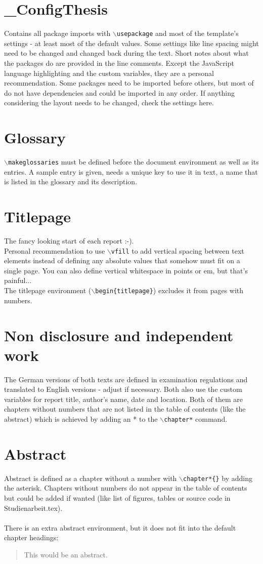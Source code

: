 \section{\_ConfigThesis}
%
Contains all package imports with \texttt{$\backslash$usepackage} and most of the template's settings - at least most of the default values. Some settings like line spacing might need to be changed and changed back during the text. Short notes about what the packages do are provided in the line comments. Except the JavaScript language highlighting and the custom variables, they are a personal recommendation. Some packages need to be imported before others, but most of do not have dependencies and could be imported in any order. If anything considering the layout needs to be changed, check the settings here.
%
\section{Glossary}
%
\texttt{$\backslash$makeglossaries} must be defined before the document environment as well as its entries. A sample entry is given, needs a unique key to use it in text, a name that is listed in the glossary and its description.
%
\section{Titlepage}
%
The fancy looking start of each report :-).\\
Personal recommendation to use \texttt{$\backslash$vfill} to add vertical spacing between text elements instead of defining any absolute values that somehow must fit on a single page. You can also define vertical whitespace in points or em, but that's painful...\\
The titlepage environment (\texttt{$\backslash$begin\{titlepage\}}) excludes it from pages with numbers.
%
\section{Non disclosure and independent work}
%
The German versions of both texts are defined in examination regulations and translated to English versions - adjust if necessary. Both also use the custom variables for report title, author's name, date and location. Both of them are chapters without numbers that are not listed in the table of contents (like the abstract) which is achieved by adding an * to the \texttt{$\backslash$chapter*} command.
%
\section{Abstract}
%
Abstract is defined as a chapter without a number with \texttt{$\backslash$chapter*\{\}} by adding the asterisk. Chapters without numbers do not appear in the table of contents but could be added if wanted (like list of figures, tables or source code in Studienarbeit.tex). 
\\
\\ There is an extra abstract environment, but it does not fit into the default chapter headings:
\begin{abstract}
	This would be an abstract.
\end{abstract}

